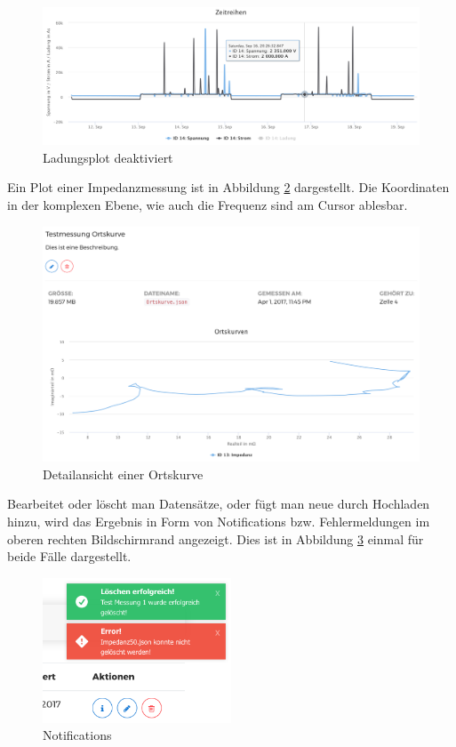\begin{figure}
\centering
\includegraphics[width=\textwidth]{Figures/legendedeaktiviert}
\caption{Ladungsplot deaktiviert}
\label{fig:legendedeaktiviert}
\end{figure} 


Ein Plot einer Impedanzmessung ist in Abbildung \ref{fig:ortskurve} dargestellt. Die Koordinaten in der komplexen Ebene, wie auch die Frequenz sind am Cursor ablesbar.

\begin{figure}
\centering
\includegraphics[width=\textwidth]{Figures/ortskurve}
\caption{Detailansicht einer Ortskurve}
\label{fig:ortskurve}
\end{figure}



Bearbeitet oder löscht man Datensätze, oder fügt man neue durch Hochladen hinzu, wird das Ergebnis in Form von Notifications bzw. Fehlermeldungen im oberen rechten Bildschirmrand angezeigt. Dies ist in Abbildung \ref{fig:notifications} einmal für beide Fälle dargestellt.

\begin{figure}
\centering
\includegraphics[width=0.5\textwidth]{Figures/notifications}
\caption{Notifications}
\label{fig:notifications}
\end{figure}

